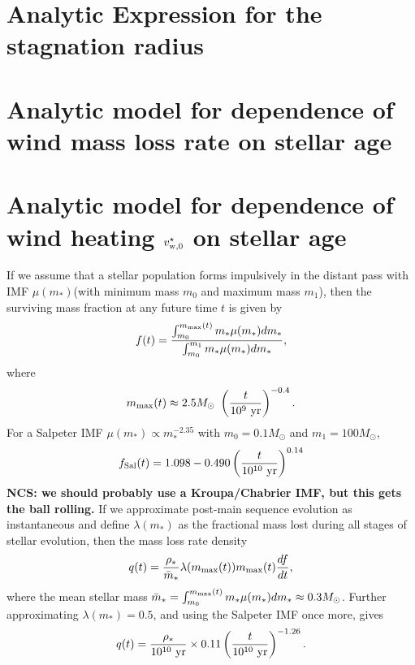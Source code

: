 \documentclass[usenatbib,fleqn]{mn2e}
\begin{document}
  \clearpage
  \appendix
  \section{Analytic Expression for the stagnation radius}
  \label{app:rs}
  

  \section{Analytic model for dependence of wind mass loss rate on stellar age}
  \label{app:eta}
  

\section{Analytic model for dependence of wind heating $v_{\rm w,0}^{\star}$ on stellar age}
\label{app:windheat}
If we assume that a stellar population forms impulsively in the distant pass with IMF $\mu(m_*)$(with minimum mass $m_0$ and maximum mass $m_1$), then the surviving mass fraction at any future time $t$ is given by 
\begin{equation}
f(t) =\frac{ \int_{m_0}^{m_{\rm max}(t)} m_* \mu(m_*) dm_* }{ \int_{m_0}^{m_1} m_* \mu(m_*) dm_* },
\end{equation}
where 
\begin{equation}
m_{\rm max}(t) \approx 2.5M_\odot~ \left( \frac{t}{10^9~{\rm yr}} \right)^{-0.4}.
\end{equation}
For a Salpeter IMF $\mu(m_*) \propto m_*^{-2.35}$ with $m_0=0.1M_\odot$ and $m_1=100M_\odot$,
\begin{equation}
f_{\rm Sal}(t) = 1.098 - 0.490 \left(\frac{t}{10^{10}~{\rm yr}} \right)^{0.14}
\end{equation}
{\bf NCS: we should probably use a Kroupa/Chabrier IMF, but this gets the ball rolling.}
If we approximate post-main sequence evolution as instantaneous and define $\lambda(m_*)$ as the fractional mass lost during all stages of stellar evolution, then the mass loss rate density
\begin{equation}
q(t) = \frac{\rho_*}{\bar{m}_*} \lambda(m_{\rm max}(t)) m_{\rm max}(t) \frac{df}{dt},
\end{equation}
where the mean stellar mass $\bar{m}_* = \int_{m_0}^{m_{\rm max}(t)} m_*\mu(m_*)dm_* \approx 0.3 M_\odot$.  Further approximating $\lambda(m_*)=0.5$, and using the Salpeter IMF once more, gives
\begin{equation}
q(t) = \frac{\rho_*}{10^{10}~{\rm yr}} \times 0.11 \left(\frac{t}{10^{10}~{\rm yr}} \right)^{-1.26}.
\end{equation}
\end{document}
